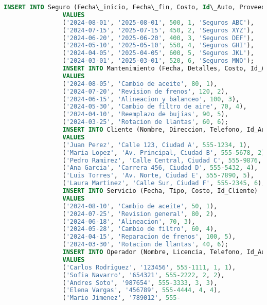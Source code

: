 \documentclass{article}
\begin{document}
\begin{lstlisting}[language=SQL, caption=Crear base de datos competencia.]
                INSERT INTO Seguro (Fecha\_inicio, Fecha\_fin, Costo, Id\_Auto, Proveedor)
                VALUES
                ('2024-08-01', '2025-08-01', 500, 1, 'Seguros ABC'),
                ('2024-07-15', '2025-07-15', 450, 2, 'Seguros XYZ'),
                ('2024-06-20', '2025-06-20', 400, 3, 'Seguros DEF'),
                ('2024-05-10', '2025-05-10', 550, 4, 'Seguros GHI'),
                ('2024-04-05', '2025-04-05', 600, 5, 'Seguros JKL'),
                ('2024-03-01', '2025-03-01', 520, 6, 'Seguros MNO');
                INSERT INTO Mantenimiento (Fecha, Detalles, Costo, Id_Auto)
                VALUES
                ('2024-08-05', 'Cambio de aceite', 80, 1),
                ('2024-07-20', 'Revision de frenos', 120, 2),
                ('2024-06-15', 'Alineacion y balanceo', 100, 3),
                ('2024-05-30', 'Cambio de filtro de aire', 70, 4),
                ('2024-04-10', 'Reemplazo de bujias', 90, 5),
                ('2024-03-25', 'Rotacion de llantas', 60, 6);
                INSERT INTO Cliente (Nombre, Direccion, Telefono, Id_Auto)
                VALUES
                ('Juan Perez', 'Calle 123, Ciudad A', 555-1234, 1),
                ('Maria Lopez', 'Av. Principal, Ciudad B', 555-5678, 2),
                ('Pedro Ramirez', 'Calle Central, Ciudad C', 555-9876, 3),
                ('Ana Garcia', 'Carrera 456, Ciudad D', 555-5432, 4),
                ('Luis Torres', 'Av. Norte, Ciudad E', 555-7890, 5),
                ('Laura Martinez', 'Calle Sur, Ciudad F', 555-2345, 6);
                INSERT INTO Servicio (Fecha, Tipo, Costo, Id_Cliente)
                VALUES
                ('2024-08-10', 'Cambio de aceite', 50, 1),
                ('2024-07-25', 'Revision general', 80, 2),
                ('2024-06-18', 'Alineacion', 70, 3),
                ('2024-05-28', 'Cambio de filtro', 60, 4),
                ('2024-04-15', 'Reparacion de frenos', 100, 5),
                ('2024-03-30', 'Rotacion de llantas', 40, 6);
                INSERT INTO Operador (Nombre, Licencia, Telefono, Id_Auto, Id_Servicio)
                VALUES
                ('Carlos Rodriguez', '123456', 555-1111, 1, 1),
                ('Sofia Navarro', '654321', 555-2222, 2, 2),
                ('Andres Soto', '987654', 555-3333, 3, 3),
                ('Elena Vargas', '456789', 555-4444, 4, 4),
                ('Mario Jimenez', '789012', 555-
               
        \end{lstlisting}
    
    \newpage
    
\end{document}
